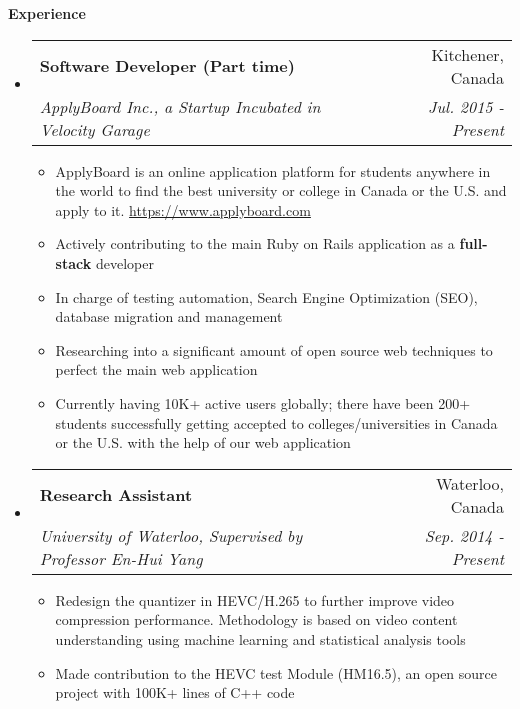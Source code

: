 \documentclass[letterpaper,10pt]{article}
\makeatletter
\newcommand{\resitem}[1]{\item #1 \vspace{-2pt}}
\newcommand{\resheading}[1]{{\large \colorbox{mygrey}{\begin{minipage}{\textwidth}{\textbf{#1 \vphantom{p\^{E}}}}\end{minipage}}}}
\newcommand{\ressubheading}[4]{
\begin{tabular*}{7.0in}{l@{\extracolsep{\fill}}r}
		\textbf{#1} & #2 \\
		\textit{#3} & \textit{#4} \\
\end{tabular*}\vspace{-6pt}}
\makeatother
\begin{document}
\resheading{Experience}
\begin{itemize}
\itemsep0em
\item
    \ressubheading{Software Developer (Part time)}{Kitchener, Canada}{ApplyBoard Inc., a Startup Incubated in Velocity Garage}{ Jul. 2015 - Present}
	\begin{itemize}
		\resitem{ApplyBoard is an online application platform for students anywhere in the world to find the best university or college in Canada or the U.S. and apply to it. \url{https://www.applyboard.com} }
        \resitem{Actively contributing to the main Ruby on Rails application as a \textbf{full-stack} developer}
		\resitem{In charge of testing automation, Search Engine Optimization (SEO), database migration and management}
		\resitem{Researching into a significant amount of open source web techniques to perfect the main web application}
        \resitem{Currently having 10K+ active users globally; there have been 200+ students successfully getting accepted to colleges/universities in Canada or the U.S. with the help of our web application }
	\end{itemize}
\item
	\ressubheading{Research Assistant}{Waterloo, Canada}{University of Waterloo, Supervised by Professor En-Hui Yang}{Sep. 2014 - Present}
	\begin{itemize}
		\resitem{Redesign the quantizer in HEVC/H.265 to further improve video compression performance. Methodology is based on video content understanding using machine learning and statistical analysis tools}
		\resitem{Made contribution to the HEVC test Module (HM16.5), an open source project with 100K+ lines of C++ code}
	\end{itemize}
\end{itemize}
\end{document}
